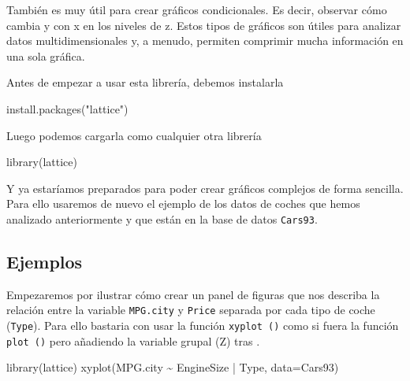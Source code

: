 \documentclass[
]{book}
\newenvironment{Shaded}{\begin{snugshade}}{\end{snugshade}}
\newcommand{\AttributeTok}[1]{\textcolor[rgb]{0.77,0.63,0.00}{#1}}
\newcommand{\FunctionTok}[1]{\textcolor[rgb]{0.00,0.00,0.00}{#1}}
\newcommand{\NormalTok}[1]{#1}
\newcommand{\SpecialCharTok}[1]{\textcolor[rgb]{0.00,0.00,0.00}{#1}}
\newcommand{\StringTok}[1]{\textcolor[rgb]{0.31,0.60,0.02}{#1}}
\begin{document}
También es muy útil para crear gráficos condicionales. Es decir, observar cómo cambia y con x en los niveles de z. Estos tipos de gráficos son útiles para analizar datos multidimensionales y, a menudo, permiten comprimir mucha información en una sola gráfica.

Antes de empezar a usar esta librería, debemos instalarla

\begin{Shaded}
\begin{Highlighting}[]
\FunctionTok{install.packages}\NormalTok{(}\StringTok{"lattice"}\NormalTok{)}
\end{Highlighting}
\end{Shaded}

Luego podemos cargarla como cualquier otra librería

\begin{Shaded}
\begin{Highlighting}[]
\FunctionTok{library}\NormalTok{(lattice)}
\end{Highlighting}
\end{Shaded}

Y ya estaríamos preparados para poder crear gráficos complejos de forma sencilla. Para ello usaremos de nuevo el ejemplo de los datos de coches que hemos analizado anteriormente y que están en la base de datos \texttt{Cars93}.

\hypertarget{ejemplos-1}{%
\subsection*{Ejemplos}\label{ejemplos-1}}

Empezaremos por ilustrar cómo crear un panel de figuras que nos describa la relación entre la variable \texttt{MPG.city} y \texttt{Price} separada por cada tipo de coche (\texttt{Type}). Para ello bastaria con usar la función \texttt{xyplot\ ()} como si fuera la función \texttt{plot\ ()} pero añadiendo la variable grupal (Z) tras \texttt{\textbar{}}.

\begin{Shaded}
\begin{Highlighting}[]
\FunctionTok{library}\NormalTok{(lattice)}
\FunctionTok{xyplot}\NormalTok{(MPG.city }\SpecialCharTok{\textasciitilde{}}\NormalTok{ EngineSize }\SpecialCharTok{|}\NormalTok{ Type, }\AttributeTok{data=}\NormalTok{Cars93)}
\end{Highlighting}
\end{Shaded}
\end{document}

